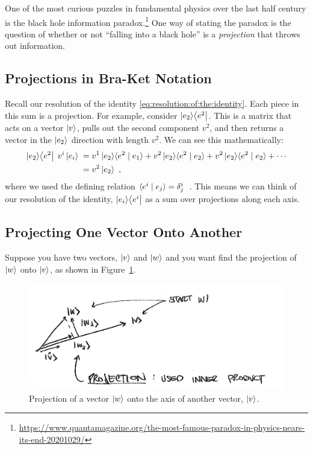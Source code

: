 \documentclass[12pt, oneside]{report}    %
\begin{document}
\begin{example}
One of the most curious puzzles in fundamental physics over the last half century is the black hole information paradox.\footnote{\url{https://www.quantamagazine.org/the-most-famous-paradox-in-physics-nears-its-end-20201029/}} One way of stating the paradox is the question of whether or not ``falling into a black hole'' is a \emph{projection} that throws out information. 
\end{example}

\subsection{Projections in Bra-Ket Notation}
Recall our resolution of the identity \eqref{eq:resolution:of:the:identity}. Each piece in this sum is a projection. For example, consider $\left|e_2\right\rangle\!\left\langle e^2\right|$. This is a matrix that acts on a vector $\left|v\right\rangle$, pulls out the second component $v^2$, and then returns a vector in the $\left|e_2\right\rangle$ direction with length $v^2$. We can see this mathematically:
\begin{align}
    \left|e_2\right\rangle\!\left\langle e^2\right| \; v^i\left|e_i\right\rangle \;
    &= 
    v^1\left|e_2\right\rangle\!\langle{e^2}\mid {e_1}\rangle + 
    v^2\left|e_2\right\rangle\!\langle{e^2}\mid {e_2}\rangle +
    v^2\left|e_2\right\rangle\!\langle{e^2}\mid {e_2}\rangle + \cdots
    \\ 
    &= v^2 \left|e_2\right\rangle \ ,
    \label{eq:projection:e2:e2}
\end{align}
where we used the defining relation $\langle e^i \mid e_j \rangle = \delta^i_j$\ . This means we can think of our resolution of the identity, $\left|e_i\right\rangle\!\left\langle e^i\right|$ as a sum over projections along each axis. 

\subsection{Projecting One Vector Onto Another}

Suppose you have two vectors, $\left|v\right\rangle$ and $\left|w\right\rangle$ and you want find the projection of $\left|w\right\rangle$ onto $\left|v\right\rangle$, as shown in Figure~\ref{fig:gram:projection}. 
\begin{figure}[tb]
    \centering
    \includegraphics[width=.8\textwidth]{figures/gram-projection.jpg}
    \caption{Projection of a vector $\left|w\right\rangle$ onto the axis of another vector, $\left|v\right\rangle$.}
    \label{fig:gram:projection}
\end{figure}
\end{document}
